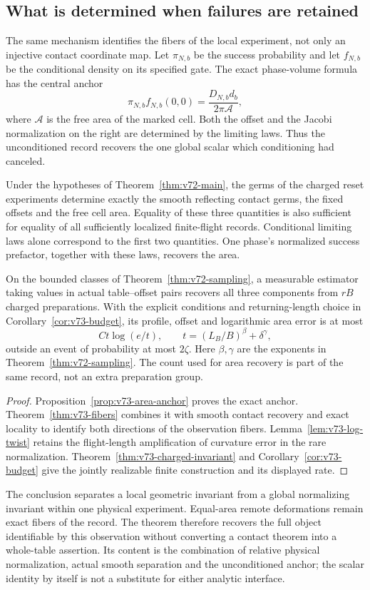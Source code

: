 \subsection{What is determined when failures are retained}

The same mechanism identifies the fibers of the local experiment, not
only an injective contact coordinate map.  Let $\pi_{N,b}$ be the
success probability and let $f_{N,b}$ be the conditional density on its
specified gate.  The exact phase-volume formula has the central anchor
\[
 \pi_{N,b}f_{N,b}(0,0)=\frac{D_{N,b}d_b}{2\pi\mathcal A},
\]
where $\mathcal A$ is the free area of the marked cell.  Both the offset
and the Jacobi normalization on the right are determined by the limiting
laws.  Thus the unconditioned record recovers the one global scalar
which conditioning had canceled.

\begin{theorem}
\label{thm:v73-main}
Under the hypotheses of Theorem~\ref{thm:v72-main}, the germs of the
charged reset experiments determine exactly the smooth reflecting
contact germs, the fixed offsets and the free cell area.  Equality of
these three quantities is also sufficient for equality of all sufficiently
localized finite-flight records.  Conditional limiting laws alone
correspond to the first two quantities.  One phase's normalized success
prefactor, together with these laws, recovers the area.

On the bounded classes of Theorem~\ref{thm:v72-sampling}, a measurable
estimator taking values in actual table--offset pairs recovers all three
components from $rB$ charged preparations.  With the explicit conditions
and returning-length choice in Corollary~\ref{cor:v73-budget}, its
profile, offset and logarithmic area error is at most
\[
 C t\log(e/t),\qquad t=(L_B/B)^\beta+\delta^\gamma,
\]
outside an event of probability at most $2\zeta$.  Here $\beta,\gamma$
are the exponents in Theorem~\ref{thm:v72-sampling}.  The count used for
area recovery is part of the same record, not an extra preparation group.
\end{theorem}
\begin{proof}
Proposition~\ref{prop:v73-area-anchor} proves the exact anchor.
Theorem~\ref{thm:v73-fibers} combines it with smooth contact recovery
and exact locality to identify both directions of the observation fibers.
Lemma~\ref{lem:v73-log-twist} retains the flight-length amplification
of curvature error in the rare normalization.
Theorem~\ref{thm:v73-charged-invariant} and
Corollary~\ref{cor:v73-budget} give the jointly realizable finite
construction and its displayed rate.
\end{proof}

The conclusion separates a local geometric invariant from a global
normalizing invariant within one physical experiment.  Equal-area
remote deformations remain exact fibers of the record.  The theorem
therefore recovers the full object identifiable by this observation
without converting a contact theorem into a whole-table assertion.
Its content is the combination of relative physical normalization,
actual smooth separation and the unconditioned anchor; the scalar
identity by itself is not a substitute for either analytic interface.
